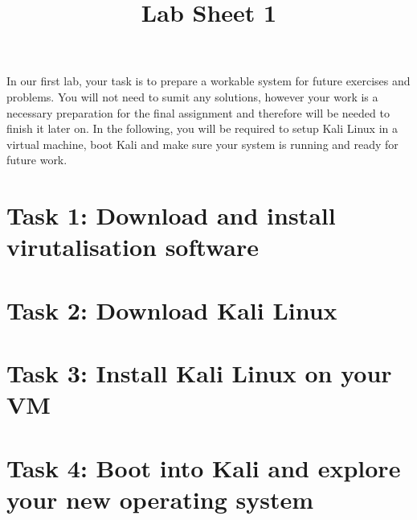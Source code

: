 \documentclass{article}
\title{Lab Sheet 1}
\begin{document}
\maketitle
In our first lab, your task is to prepare a workable system for future exercises and problems. You will not need to sumit any solutions, however your work is a necessary preparation for the final assignment and therefore will be needed to finish it later on. In the following, you will be required to setup Kali Linux in a virtual machine, boot Kali and make sure your system is running and ready for future work.
\section{Task 1: Download and install virutalisation software}
\section{Task 2: Download Kali Linux}
\section{Task 3: Install Kali Linux on your VM}
\section{Task 4: Boot into Kali and explore your new operating system}
\end{document}
